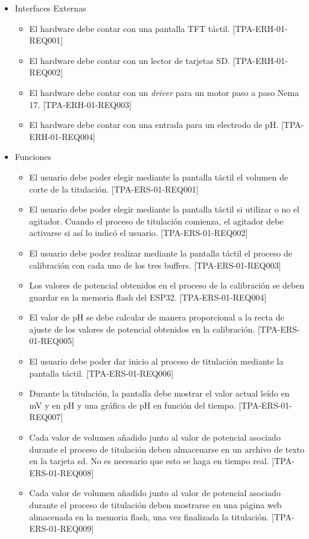 \begin{itemize}
\item Interfaces Externas
	\begin{itemize}
	\item El hardware debe contar con una pantalla TFT táctil. [TPA-ERH-01-REQ001]
	\item El hardware debe contar con un lector de tarjetas SD. [TPA-ERH-01-REQ002]
	\item El hardware debe contar con un \textit{driver} para un motor paso a paso Nema 17. [TPA-ERH-01-REQ003]
	\item El hardware debe contar con una entrada para un electrodo de pH. [TPA-ERH-01-REQ004]
	\end{itemize}
	
\item Funciones
	\begin{itemize}
	\item El usuario debe poder elegir mediante la pantalla táctil el volumen de corte de la titulación. [TPA-ERS-01-REQ001]
	\item El usuario debe poder elegir mediante la pantalla táctil si utilizar o no el agitador. Cuando el proceso de titulación comienza, el agitador debe activarse si así lo indicó el usuario. [TPA-ERS-01-REQ002]
	\item El usuario debe poder realizar mediante la pantalla táctil el proceso de calibración con cada uno de los tres buffers. [TPA-ERS-01-REQ003]
	\item Los valores de potencial obtenidos en el proceso de la calibración se deben guardar en la memoria flash del ESP32. [TPA-ERS-01-REQ004]
	\item El valor de pH se debe calcular de manera proporcional a la recta de ajuste de los valores de potencial obtenidos en la calibración. [TPA-ERS-01-REQ005]
	\item El usuario debe poder dar inicio al proceso de titulación mediante la pantalla táctil. [TPA-ERS-01-REQ006]
	\item Durante la titulación, la pantalla debe mostrar el valor actual leído en mV y en pH y una gráfica de pH en función del tiempo. [TPA-ERS-01-REQ007]
	\item Cada valor de volumen añadido junto al valor de potencial asociado durante el proceso de titulación deben almacenarse en un archivo de texto en la tarjeta sd. No es necesario que esto se haga en tiempo real. [TPA-ERS-01-REQ008]
	\item Cada valor de volumen añadido junto al valor de potencial asociado durante el proceso de titulación deben mostrarse en una página web almacenada en la memoria flash, una vez finalizada la titulación. [TPA-ERS-01-REQ009]

\end{itemize}
\end{itemize}
